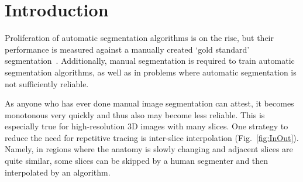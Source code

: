 \documentclass{InsightArticle}
\newcommand{\IJhandlerIDnumber}{3563}
\begin{document}
\IJhandlenote{\IJhandlerIDnumber}

\newpage

\tableofcontents


\section{Introduction}

Proliferation of automatic segmentation algorithms is on the rise,
but their performance is measured against a manually created `gold standard' segmentation~\cite{py06nimg}.
Additionally, manual segmentation is required to train automatic segmentation algorithms,
as well as in problems where automatic segmentation is not sufficiently reliable.

As anyone who has ever done manual image segmentation can attest,
it becomes monotonous very quickly and thus also may become less reliable.
This is especially true for high-resolution 3D images with many slices.
One strategy to reduce the need for repetitive tracing is inter-slice interpolation (Fig.~\ref{fig:InOut}).
Namely, in regions where the anatomy is slowly changing and adjacent slices are quite similar,
some slices can be skipped by a human segmenter and then interpolated by an algorithm.
\end{document}
